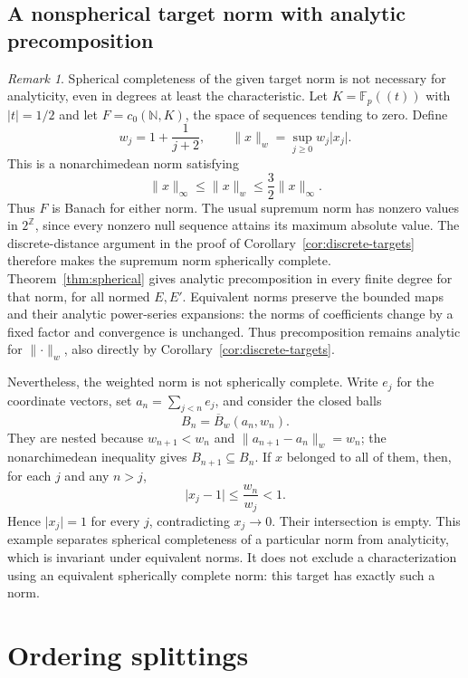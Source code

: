 \documentclass[11pt]{amsart}
\theoremstyle{definition}
\theoremstyle{remark}
\newtheorem{remark}[theorem]{Remark}
\numberwithin{equation}{section}
\newcommand{\N}{\mathbb N}
\newcommand{\Z}{\mathbb Z}
\newcommand{\F}{\mathbb F}
\newcommand{\abs}[1]{\lvert #1\rvert}
\newcommand{\norm}[1]{\lVert #1\rVert}
\theoremstyle{plain}
\theoremstyle{definition}
\theoremstyle{plain}
\begin{document}
\subsection{A nonspherical target norm with analytic precomposition}
\begin{remark}\label{rem:nonspherical-analytic-target}
Spherical completeness of the given target norm is not necessary for analyticity, even in degrees
at least the characteristic. Let $K=\F_p((t))$ with $\abs t=1/2$ and let $F=c_0(\N,K)$, the space
of sequences tending to zero. Define
\[
 w_j=1+\frac1{j+2},\qquad \norm{x}_w=\sup_{j\ge0}w_j\abs{x_j}.
\]
This is a nonarchimedean norm satisfying
\[
 \norm{x}_\infty\le\norm{x}_w\le\frac32\norm{x}_\infty.
\]
Thus $F$ is Banach for either norm. The usual supremum norm has nonzero values in $2^\Z$,
since every nonzero null sequence attains its maximum absolute value. The discrete-distance
argument in the proof of Corollary~\ref{cor:discrete-targets} therefore makes the supremum norm
spherically complete. Theorem~\ref{thm:spherical} gives analytic precomposition in every finite
degree for that norm, for all normed $E,E'$. Equivalent norms preserve the bounded maps and their
analytic power-series expansions: the norms of coefficients change by a fixed factor and convergence
is unchanged. Thus precomposition remains analytic for $\norm\cdot_w$, also directly by
Corollary~\ref{cor:discrete-targets}.

Nevertheless, the weighted norm is not spherically complete. Write $e_j$ for the coordinate vectors,
set $a_n=\sum_{j<n}e_j$, and consider the closed balls
\[
 B_n=\overline B_w(a_n,w_n).
\]
They are nested because $w_{n+1}<w_n$ and $\norm{a_{n+1}-a_n}_w=w_n$; the nonarchimedean
inequality gives $B_{n+1}\subseteq B_n$. If $x$ belonged to all of them, then, for each $j$ and
any $n>j$,
\[
 \abs{x_j-1}\le\frac{w_n}{w_j}<1.
\]
Hence $\abs{x_j}=1$ for every $j$, contradicting $x_j\to0$. Their intersection is empty.
This example separates spherical completeness of a particular norm from analyticity, which is
invariant under equivalent norms. It does not exclude a characterization using an equivalent
spherically complete norm: this target has exactly such a norm.
\end{remark}
\section{Ordering splittings}\label{app:ordering}
\end{document}
